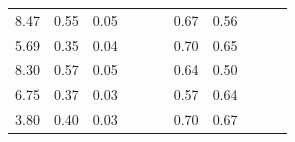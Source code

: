 \begin{refsection}[referencesCh3]
\begin{table}
\begin{adjustbox}{scale=0.65,center}
\begin{tabular}{@{}ccccccccccc@{}}
		8.47                                                         & 0.55                                                & 0.05                                                &                                                     &                                                     &                                                      & 0.67                                                & 0.56                                                  &                                                         &                                                      & \cite{ADAS}            \\
		5.69                                                         & 0.35                                                & 0.04                                                &                                                     &                                                     &                                                      & 0.70                                                & 0.65                                                  &                                                         &                                                      & \cite{ADAS}            \\
		8.30                                                         & 0.57                                                & 0.05                                                &                                                     &                                                     &                                                      & 0.64                                                & 0.50                                                  &                                                         &                                                      & \cite{ADAS}            \\
		6.75                                                         & 0.37                                                & 0.03                                                &                                                     &                                                     &                                                      & 0.57                                                & 0.64                                                  &                                                         &                                                      & \cite{ADAS}           \\
		3.80                                                         & 0.40                                                & 0.03                                                &                                                     &                                                     &                                                      & 0.70                                                & 0.67                                                  &                                                         &                                                      & \cite{ADAS}            \\

\end{tabular}
\end{adjustbox}
\end{table}
\end{refsection}
